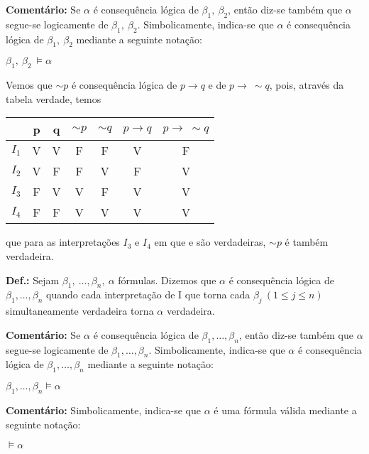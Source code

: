 \bigskip
\noindent
\textbf{Comentário:} Se $\alpha$ é consequência lógica de $\beta_1,\ \beta_2$, então diz-se também que $\alpha$ segue-se logicamente de $\beta_1,\ \beta_2$. Simbolicamente, indica-se que $\alpha$ é consequência lógica de $\beta_1,\ \beta_2$ mediante a seguinte notação:

\centerline{$\beta_1,\ \beta_2\ \vDash \alpha$} %

\begin{exemplo}
    Vemos que $\sim p$ é consequência lógica de $p \to q$ e de $p \to\ \sim q$, pois, através da tabela verdade, temos
\end{exemplo}

\begin{center}
    \begin{tabular}{c c c c c c c}
              & p & q & $\sim p$ & $\sim q$ & $p \to q$ & $p \to\ \sim q$ \\ \hline
        $I_1$ & V & V & F        & F        & V         & F \\
        $I_2$ & V & F & F        & V        & F         & V \\
        $I_3$ & F & V & V        & F        & V         & V \\
        $I_4$ & F & F & V        & V        & V         & V \\
    \end{tabular}
\end{center}
que para as interpretações $I_3$ e $I_4$ em que  e  são verdadeiras, $\sim p$ é também verdadeira.

\bigskip
\noindent
\textbf{Def.:} Sejam $\beta_1,\ \dots, \beta_n,\ \alpha$ fórmulas. Dizemos que $\alpha$ é consequência lógica de $\beta_1,\dots, \beta_n$ quando cada interpretação de I que torna cada $\beta_j\ (1 \leq j \leq n)$ simultaneamente verdadeira torna $\alpha$ verdadeira.

\bigskip
\noindent
\textbf{Comentário:} Se $\alpha$ é consequência lógica de $\beta_1,\dots, \beta_n$, então diz-se também que $\alpha$ segue-se logicamente de $\beta_1,\dots, \beta_n$. Simbolicamente, indica-se que $\alpha$ é consequência lógica de $\beta_1,\dots, \beta_n$ mediante a seguinte notação:

\centerline{$\beta_1,\dots, \beta_n \vDash \alpha$}

\bigskip
\noindent
\textbf{Comentário:} Simbolicamente, indica-se que $\alpha$ é uma fórmula válida mediante a seguinte notação:

\centerline{$\vDash \alpha$}

